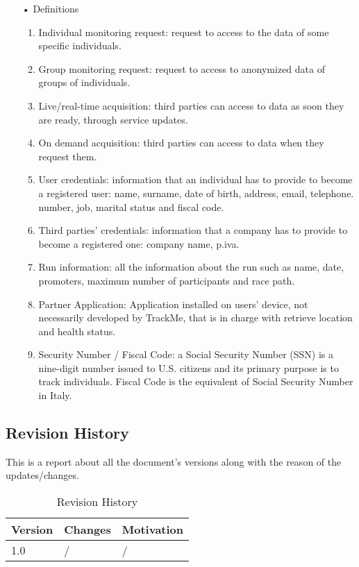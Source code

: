 \begin{enumerate}
\item[•] {\Large Definitions}
	\begin{enumerate}
		\item Individual monitoring request: request to access to the data of some specific  individuals.
		\item Group monitoring request: request to access to anonymized data of groups of individuals.
		\item Live/real-time acquisition: third parties can access to data as soon they are ready, 				through service updates.
		\item On demand acquisition: third parties can access to data when they request 				them.
		\item User credentials: information that an individual has to provide to become a 				registered user: name, surname, date of birth, address, email, telephone.
			number, job, marital status and fiscal code. 
		\item Third parties' credentials: information that a company has to provide to 					become a registered one: company name, p.iva.
		\item Run information: all the information about the run such as name, date, promoters, 				maximum number of participants and race path.
		\item Partner Application: Application installed on users' device, not necessarily developed by TrackMe, that is in charge with retrieve location and health status. 
		\item Security Number / Fiscal Code: a Social Security Number (SSN) is a nine-digit number issued to U.S. citizens and its primary purpose is to track individuals. Fiscal Code is the equivalent of Social Security Number in Italy.
	\end{enumerate}
\end{enumerate}

\subsection{Revision History}
This is a report about all the document's versions along with the reason of the updates/changes.

\begin{table}[h]
\centering
\begin{tabular}{|l|p{}|p{}|}
\hline
Version & Changes & Motivation\\ \hline
1.0     & / & / \\ \hline
\end{tabular}
\caption{Revision History}
\end{table}

